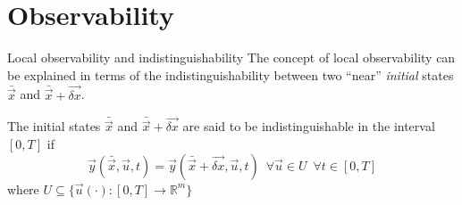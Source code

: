\section{Observability}

\begin{frame}{Local observability and indistinguishability}
The concept of local observability can be explained in terms of the indistinguishability
between two ``near'' \emph{initial} states $\bar{\vec{x}}$ and $\bar{\vec{x}} + \vec{\delta x}$.
\par
The initial states $\bar{\vec{x}}$ and $\bar{\vec{x}} + \vec{\delta x}$ are said to be
indistinguishable in the interval $[0, T]$ if
\[
\vec{y}(\bar{\vec{x}}, \vec{u}, t) = \vec{y}(\bar{\vec{x}} + \vec{\delta x}, \vec{u}, t)\enspace
\forall \vec{u} \in U \enspace \forall t \in [0,T]
\]
where $U \subseteq \{\vec{u}(\cdot):[0,T] \rightarrow \mathbb{R}^{m}\}$



\end{frame}
